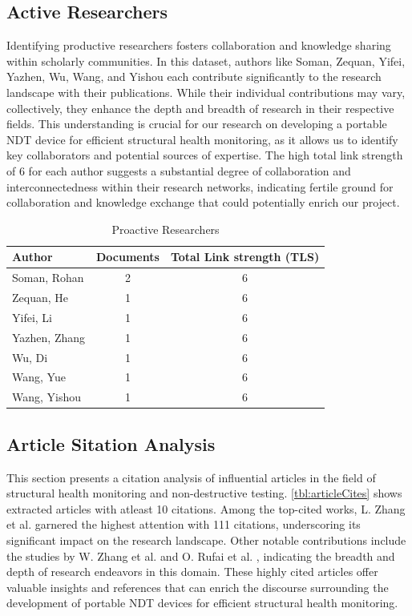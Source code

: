 \documentclass[journal, a4paper]{IEEEtran}
\begin{document}
\subsection{Active Researchers}
Identifying productive researchers fosters collaboration and knowledge sharing within scholarly communities.
In this dataset, authors like Soman, Zequan, Yifei, Yazhen, Wu, Wang, and Yishou each contribute significantly
to the research landscape with their publications.
While their individual contributions may vary, collectively,
they enhance the depth and breadth of research in their respective fields.
This understanding is crucial for our research on developing a portable NDT device for efficient structural health monitoring,
as it allows us to identify key collaborators and potential sources of expertise.
The high total link strength of 6 for each author suggests a substantial degree of collaboration and
interconnectedness within their research networks, indicating fertile ground for collaboration and knowledge
exchange that could potentially enrich our project.


\begin{table}[htbp]

  \centering
  \caption{Proactive Researchers}
  \label{tbl:bresearchers}
  \begin{tabular}{lcc}

      \toprule
      \textbf{Author} & \textbf{Documents} & \textbf{Total Link strength (TLS)} \\
      \midrule
      Soman, Rohan & 2 & 6 \\
      Zequan, He & 1 & 6 \\
      Yifei, Li & 1 & 6 \\
      Yazhen, Zhang & 1 & 6 \\
      Wu, Di & 1 & 6 \\
      Wang, Yue & 1 & 6 \\
      Wang, Yishou & 1 & 6 \\
      \bottomrule
  \end{tabular}
\end{table}


\subsection{Article Sitation Analysis}
This section presents a citation analysis of influential articles in the field of structural health monitoring and non-destructive testing.
\autoref{tbl:articleCites} shows extracted articles with atleast 10 citations.
Among the top-cited works, L. Zhang et al. \cite{zhang_structural_2021} garnered the highest attention with 111 citations,
underscoring its significant impact on the research landscape.
Other notable contributions include the studies by W. Zhang et al. \cite{zhang_defect_2020}
and O. Rufai et al. \cite{rufai_cure_2020}, indicating the breadth and depth of research endeavors in this domain.
These highly cited articles offer valuable insights and references
that can enrich the discourse surrounding the development of portable NDT devices for efficient structural health monitoring.
\end{document}
